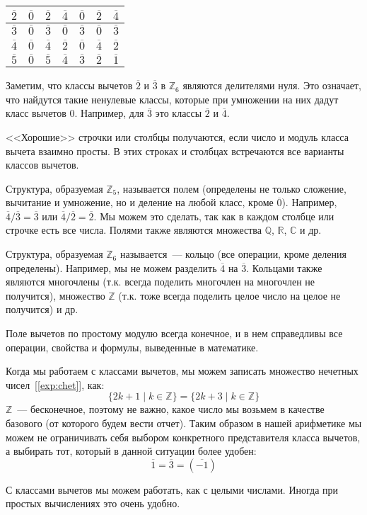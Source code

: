 \documentclass[russian]{lecture-notes}
\newcommand{\klas}[1]{\overline{#1}}
\begin{document}
\begin{example}
\begin{table}[H]
\begin{subtable}[H]{0.49\linewidth}
\begin{tabular}{|c|c|c|c|c|c|c|}
				$\klas{2}$ & $\klas{0}$ & $\klas{2}$ & $\klas{4}$ & $\klas{0}$ & $\klas{2}$ & $\klas{4}$\\ \hline
				
				$\klas{3}$ & $\klas{0}$ & $\klas{3}$ & $\klas{0}$ & $\klas{3}$ & $\klas{0}$ & $\klas{3}$\\ \hline
				
				$\klas{4}$ & $\klas{0}$ & $\klas{4}$ & $\klas{2}$ & $\klas{0}$ & $\klas{4}$ & $\klas{2}$\\ \hline
				
				$\klas{5}$ & $\klas{0}$ & $\klas{5}$ & $\klas{4}$ & $\klas{3}$ & $\klas{2}$ & $\klas{1}$\\ \hline
			\end{tabular}
		\end{subtable}
	\end{table}
\end{example}

\begin{note}
	Заметим, что классы вычетов $\klas{2}$ и $\klas{3}$ в $\mathbb{Z}_6$ являются делителями нуля. Это означает, что найдутся такие ненулевые классы, которые при умножении на них дадут класс вычетов 0.  Например, для $\klas{3}$ это классы $\klas{2}$ и $\klas{4}$.
	
	<<Хорошие>> строчки или столбцы получаются, если число и модуль класса вычета взаимно просты. В этих строках и столбцах встречаются все варианты классов вычетов.
	
	Структура, образуемая $\mathbb{Z}_5$, называется полем (определены не только сложение, вычитание и умножение, но и деление на любой класс, кроме $\klas{0}$). Например, $\klas{4} / \klas{3} = \klas{3}$ или $\klas{4} / \klas{2} = \klas{2}$. Мы можем это сделать, так как в каждом столбце или строчке есть все числа. Полями также являются множества $\mathbb{Q}$, $\mathbb{R}$, $\mathbb{C}$ и др.

	Структура, образуемая $\mathbb{Z}_6$ называется~--- кольцо (все операции, кроме деления определены). Например, мы не можем разделить $\klas{4}$ на $\klas{3}$. Кольцами также являются многочлены (т.к. всегда поделить многочлен на многочлен не получится), множество $\mathbb{Z}$ (т.к. тоже всегда поделить целое число на целое не получится) и др.
	
	Поле вычетов по простому модулю всегда конечное, и в нем справедливы все операции, свойства и формулы, выведенные в математике.
	
	Когда мы работаем с классами вычетов, мы можем записать множество нечетных чисел~[\ref{exp:chet}], как:
	\[
		\{ 2k+1 \mid k \in \mathbb{Z}\} = \{ 2k+3 \mid k \in \mathbb{Z}\}
	\]
	$\mathbb{Z}$~--- бесконечное, поэтому не важно, какое число мы возьмем в качестве базового (от которого будем вести отчет). Таким образом в нашей арифметике мы можем не ограничивать себя выбором конкретного представителя класса вычетов, а выбирать тот, который в данной ситуации более удобен:
	\[
		\klas{1} = \klas{3} = (\klas{-1})
	\]
	
	С классами вычетов мы можем работать, как с целыми числами. Иногда при простых вычислениях это очень удобно.
\end{note}
\end{document}
